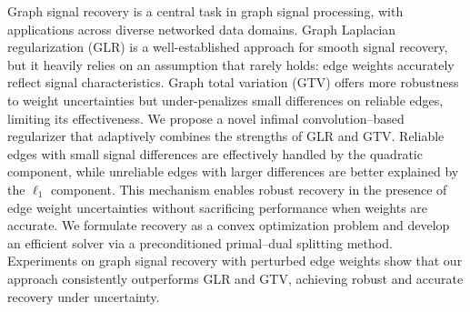 Graph signal recovery is a central task in graph signal processing, with applications across diverse networked data domains. 
Graph Laplacian regularization (GLR) is a well-established approach for smooth signal recovery, but it heavily relies on an assumption that rarely holds: edge weights accurately reflect signal characteristics.
Graph total variation (GTV) offers more robustness to weight uncertainties but under-penalizes small differences on reliable edges, limiting its effectiveness.
We propose a novel infimal convolution–based regularizer that adaptively combines the strengths of GLR and GTV. 
Reliable edges with small signal differences are effectively handled by the quadratic component, while unreliable edges with larger differences are better explained by the $\ell_{1}$ component. 
This mechanism enables robust recovery in the presence of edge weight uncertainties without sacrificing performance when weights are accurate.
We formulate recovery as a convex optimization problem and develop an efficient solver via a preconditioned primal–dual splitting method. 
Experiments on graph signal recovery with perturbed edge weights show that our approach consistently outperforms GLR and GTV, achieving robust and accurate recovery under uncertainty.